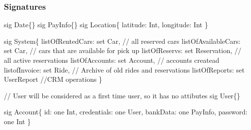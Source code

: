 \documentclass[a4paper]{article}
\begin{document}
\subsubsection{Signatures}

\ttfamily
sig Date\{\} \newline
\newline
sig PayInfo\{\} \newline
\newline
sig Location\{ \newline
\hspace*{5 mm}	latitude: Int, \newline
\hspace*{5 mm}	longitude: Int \newline
\} \newline

sig System\{ \newline
\hspace*{5 mm}	listOfRentedCars: set Car, // all reserved cars   \newline
\hspace*{5 mm}	listOfAvailableCars: set Car, // cars that are available for pick up  \newline
\hspace*{5 mm}	listOfReservs: set Reservation, // all active reservations  \newline
\hspace*{5 mm}	listOfAccounts: set Account, // accounts createad  \newline
\hspace*{5 mm}	listofInvoice: set Ride, // Archive of old rides and reservations  \newline
\hspace*{5 mm}	listOfReports: set UserReport //CRM operations  \newline
\} \newline

// User will be considered as a first time user, so it has no attibutes  \newline
sig User\{\} \newline

sig Account\{  \newline
\hspace*{5 mm}	id: one Int, \newline
\hspace*{5 mm}	credentials: one User,  \newline
\hspace*{5 mm}	bankData: one PayInfo, \newline
\hspace*{5 mm}	password: one Int \newline
\} \newline
\end{document}

